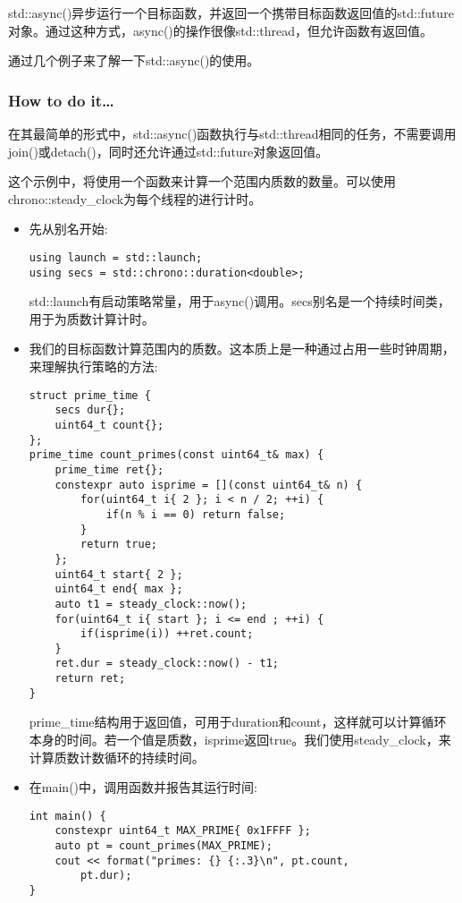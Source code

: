 
std::async()异步运行一个目标函数，并返回一个携带目标函数返回值的std::future对象。通过这种方式，async()的操作很像std::thread，但允许函数有返回值。

通过几个例子来了解一下std::async()的使用。

\subsubsection{How to do it…}

在其最简单的形式中，std::async()函数执行与std::thread相同的任务，不需要调用join()或detach()，同时还允许通过std::future对象返回值。

这个示例中，将使用一个函数来计算一个范围内质数的数量。可以使用chrono::steady\_clock为每个线程的进行计时。

\begin{itemize}
\item 
先从别名开始:

\begin{lstlisting}[style=styleCXX]
using launch = std::launch;
using secs = std::chrono::duration<double>;
\end{lstlisting}

std::launch有启动策略常量，用于async()调用。secs别名是一个持续时间类，用于为质数计算计时。

\item 
我们的目标函数计算范围内的质数。这本质上是一种通过占用一些时钟周期，来理解执行策略的方法:

\begin{lstlisting}[style=styleCXX]
struct prime_time {
	secs dur{};
	uint64_t count{};
};
prime_time count_primes(const uint64_t& max) {
	prime_time ret{};
	constexpr auto isprime = [](const uint64_t& n) {
		for(uint64_t i{ 2 }; i < n / 2; ++i) {
			if(n % i == 0) return false;
		}
		return true;
	};
	uint64_t start{ 2 };
	uint64_t end{ max };
	auto t1 = steady_clock::now();
	for(uint64_t i{ start }; i <= end ; ++i) {
		if(isprime(i)) ++ret.count;
	}
	ret.dur = steady_clock::now() - t1;
	return ret;
}
\end{lstlisting}

prime\_time结构用于返回值，可用于duration和count，这样就可以计算循环本身的时间。若一个值是质数，isprime返回true。我们使用steady\_clock，来计算质数计数循环的持续时间。

\item 
在main()中，调用函数并报告其运行时间:

\begin{lstlisting}[style=styleCXX]
int main() {
	constexpr uint64_t MAX_PRIME{ 0x1FFFF };
	auto pt = count_primes(MAX_PRIME);
	cout << format("primes: {} {:.3}\n", pt.count,
		pt.dur);
}
\end{lstlisting}


\end{itemize}
